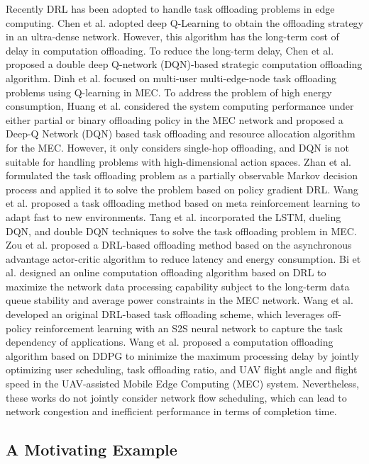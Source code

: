 \documentclass[10pt, conference, letterpaper]{IEEEtran}
\begin{document}
Recently DRL has been adopted to handle task offloading problems in edge computing. Chen et al. \cite{chen2018task} adopted deep Q-Learning to obtain the offloading strategy in an ultra-dense network. However, this algorithm has the long-term cost of delay in computation offloading. To reduce the long-term delay, Chen et al. \cite{chen2018optimized} proposed a double deep Q-network (DQN)-based strategic computation offloading algorithm. Dinh et al. \cite{dinh2018learning} focused on multi-user multi-edge-node task offloading problems using Q-learning in MEC. To address the problem of high energy consumption, Huang et al. \cite{huang2019deep} considered the system computing performance under either partial or binary offloading policy in the MEC network and proposed a Deep-Q Network (DQN) based task offloading and resource allocation algorithm for the MEC. However, it only considers single-hop offloading, and DQN is not suitable for handling problems with high-dimensional action spaces. Zhan \cite{zhan2020deep} et al. formulated the task offloading problem as a partially observable Markov decision process and applied it to solve the problem based on policy gradient DRL. Wang et al. \cite{wang2020fast} proposed a task offloading method based on meta reinforcement learning to adapt fast to new environments. Tang et al. \cite{tang2020deep} incorporated the LSTM, dueling DQN, and double DQN techniques to solve the task offloading problem in MEC. Zou et al. \cite{zou2020a3c} proposed a DRL-based offloading method based on the asynchronous advantage actor-critic algorithm to reduce latency and energy consumption. Bi et al. \cite{bi2021lyapunov} designed an online computation offloading algorithm based on DRL to maximize the network data processing capability subject to the long-term data queue stability and average power constraints in the MEC network. Wang et al. \cite{wang2021dependent} developed an original DRL-based task offloading scheme, which leverages off-policy reinforcement learning with an S2S neural network to capture the task dependency of applications. Wang et al. \cite{wang2021computation} proposed a computation offloading algorithm based on DDPG to minimize the maximum processing delay by jointly optimizing user scheduling, task offloading ratio, and UAV flight angle and flight speed in the UAV-assisted Mobile Edge Computing (MEC) system. Nevertheless, these works do not jointly consider network flow scheduling, which can lead to network congestion and inefficient performance in terms of completion time.

\subsection{A Motivating Example}
\end{document}
